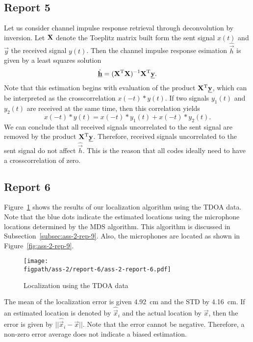 \documentclass[11pt,titlepage]{report}
\newcommand{\figpath}{../../deliverable-7-resources/figures}
\begin{document}
\subsection{Report 5}
Let us consider channel impulse response retrieval through deconvolution by inversion. Let $\mathbf{X}$ denote the Toeplitz matrix built form the sent signal $x(t)$ and $\vec{y}$ the received signal $y(t)$. Then the channel impulse response esimation $\hat{\vec{h}}$ is given by a least squares solution
\[
	\hat{\mathbf{\underline{h}}} = (\mathbf{X}^{\text T} \mathbf{X})^{-1} \mathbf{X}^{\text T} \mathbf{\underline{y}}.
\]
Note that this estimation begins with evaluation of the product $\mathbf{X}^{\text T} \mathbf{\underline{y}}$, which can be interpreted as the crosscorrelation $x(-t) \ast y(t)$. If two signals $y_1(t)$ and $y_2(t)$ are received at the same time, then this correlation yields
\[
	x(-t) \ast y(t) = x(-t) \ast y_1(t) + x(-t) \ast y_2(t).
\]
We can conclude that all received signals uncorrelated to the sent signal are removed by the product $\mathbf{X}^{\text T} \mathbf{\underline{y}}$. Therefore, received signals uncorrelated to the sent signal do not affect $\hat{\vec{h}}$. This is the reason that all codes ideally need to have a crosscorrelation of zero.

\subsection{Report 6}
Figure~\ref{fig:ass-2-rep-6} shows the results of our localization algorithm using the TDOA data. Note that the blue dots indicate the estimated locations using the microphone locations determined by the MDS algorithm. This algorithm is discussed in Subsection~\ref{subsec:ass-2-rep-9}. Also, the microphones are located as shown in Figure~\ref{fig:ass-2-rep-9}.

\begin{figure}[H]
	\begin{center}
		\texttt{[image: \\figpath/ass-2/report-6/ass-2-report-6.pdf]}
	\end{center}
	\caption{Localization using the TDOA data}
	\label{fig:ass-2-rep-6}
\end{figure}

The mean of the localization error is given \SI{4.92}{cm} and the STD by \SI{4.16}{cm}. If an estimated location is denoted by $\hat{\vec{x}}_i$ and the actual location by $\vec{x}$, then the error is given by $||\hat{\vec{x}}_i - \vec{x}||$. Note that the error cannot be negative. Therefore, a non-zero error average does not indicate a biased estimation.
\end{document}
